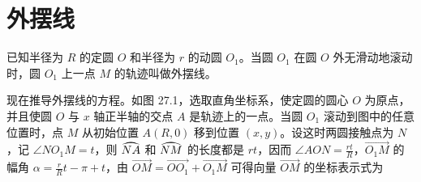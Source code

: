 \section{外摆线}

已知半径为 $R$ 的定圆 $O$ 和半径为 $r$ 的动圆 $O_1$。当圆 $O_1$ 在圆 $O$ 外无滑动地滚动时，圆 $O_1$ 上一点 $M$ 的轨迹叫做外摆线。

\noindent
\begin{minipage}[c]{0.53\textwidth}
  \setlength{\parindent}{2em}\indent
  现在推导外摆线的方程。如图 27.1，选取直角坐标系，使定圆的圆心 $O$ 为原点，并且使圆 $O$ 与 $x$ 轴正半轴的交点 $A$ 是轨迹上的一点。当圆 $O_1$ 滚动到图中的任意位置时，点 $M$ 从初始位置 $A(R, 0)$ 移到位置 $(x, y)$。设这时两圆接触点为 $N$，记 $\angle NO_1M=t$，则 $\arc{NA}$ 和 $\arc{NM}$ 的长度都是 $rt$，因而 $\angle AON = \frac{rt}{R}$，$\overrightarrow{O_1M}$ 的幅角 $\alpha = \frac{r}{R}t - \pi + t$，由 $\overrightarrow{OM} = \overrightarrow{OO_1} + \overrightarrow{O_1M}$ 可得向量 $\overrightarrow{OM}$ 的坐标表示式为
\end{minipage}
\hfill
